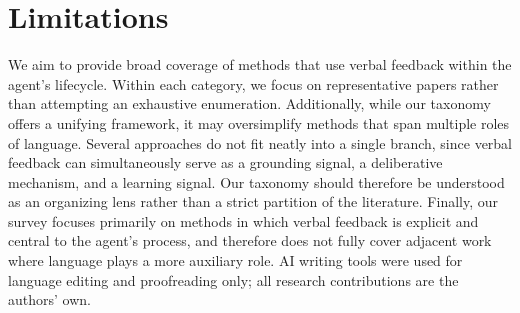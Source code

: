 \documentclass[11pt]{article}
\begin{document}
\newpage
\section*{Limitations}
We aim to provide broad coverage of methods that use verbal feedback within the agent's lifecycle. Within each category, we focus on representative papers rather than attempting an exhaustive enumeration. Additionally, while our taxonomy offers a unifying framework, it may oversimplify methods that span multiple roles of language. Several approaches do not fit neatly into a single branch, since verbal feedback can simultaneously serve as a grounding signal, a deliberative mechanism, and a learning signal. Our taxonomy should therefore be understood as an organizing lens rather than a strict partition of the literature. Finally, our survey focuses primarily on methods in which verbal feedback is explicit and central to the agent’s process, and therefore does not fully cover adjacent work where language plays a more auxiliary role. AI writing tools were used for language editing and proofreading only; all research contributions are the authors' own.




\newpage
\appendix
% 
\end{document}
